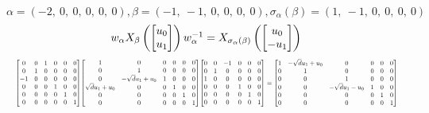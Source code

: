 \documentclass[11pt]{article}
\theoremstyle{definition}
\begin{document}
\[
\alpha = \left( -2, \  0, \  0, \  0, \  0, \  0\right), \beta = \left( -1, \  -1, \  0, \  0, \  0, \  0\right), \sigma_{\alpha}(\beta) = \left( 1, \  -1, \  0, \  0, \  0, \  0\right)
\]
\[
\scaletoalign{\textwidth}{w_{\alpha} X_{\beta}\left(\left[\begin{matrix}u_{0}\\u_{1}\end{matrix}\right]\right) w_{\alpha}^{-1} = X_{\sigma_{\alpha}\left(\beta\right)}\left(\left[\begin{matrix}u_{0}\\- u_{1}\end{matrix}\right]\right)}
\]
\[
\scaletoalign{\textwidth}{{\left[\begin{matrix}0 & 0 & 1 & 0 & 0 & 0\\0 & 1 & 0 & 0 & 0 & 0\\-1 & 0 & 0 & 0 & 0 & 0\\0 & 0 & 0 & 1 & 0 & 0\\0 & 0 & 0 & 0 & 1 & 0\\0 & 0 & 0 & 0 & 0 & 1\end{matrix}\right]} {\left[\begin{matrix}1 & 0 & 0 & 0 & 0 & 0\\0 & 1 & 0 & 0 & 0 & 0\\0 & - \sqrt{d} u_{1} + u_{0} & 1 & 0 & 0 & 0\\\sqrt{d} u_{1} + u_{0} & 0 & 0 & 1 & 0 & 0\\0 & 0 & 0 & 0 & 1 & 0\\0 & 0 & 0 & 0 & 0 & 1\end{matrix}\right]} {\left[\begin{matrix}0 & 0 & -1 & 0 & 0 & 0\\0 & 1 & 0 & 0 & 0 & 0\\1 & 0 & 0 & 0 & 0 & 0\\0 & 0 & 0 & 1 & 0 & 0\\0 & 0 & 0 & 0 & 1 & 0\\0 & 0 & 0 & 0 & 0 & 1\end{matrix}\right]} = {\left[\begin{matrix}1 & - \sqrt{d} u_{1} + u_{0} & 0 & 0 & 0 & 0\\0 & 1 & 0 & 0 & 0 & 0\\0 & 0 & 1 & 0 & 0 & 0\\0 & 0 & - \sqrt{d} u_{1} - u_{0} & 1 & 0 & 0\\0 & 0 & 0 & 0 & 1 & 0\\0 & 0 & 0 & 0 & 0 & 1\end{matrix}\right]}}
\]
\end{document}
